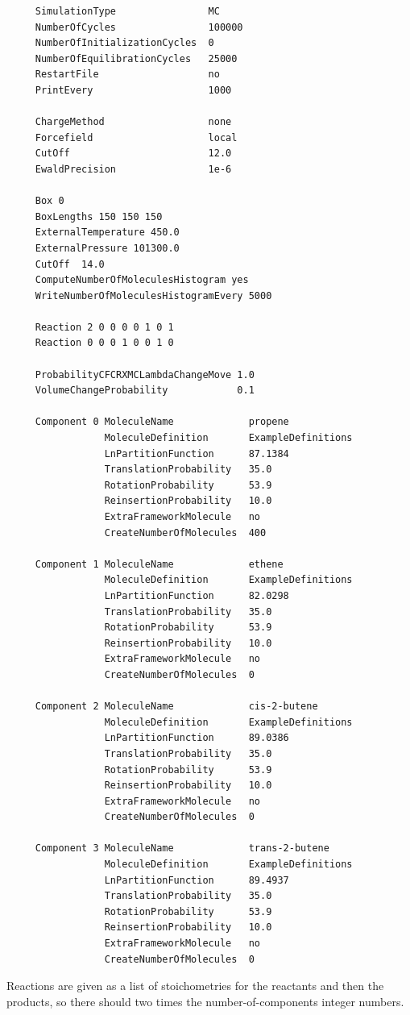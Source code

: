 \begin{tiny}
\begin{verbatim}
     SimulationType                MC
     NumberOfCycles                100000
     NumberOfInitializationCycles  0
     NumberOfEquilibrationCycles   25000
     RestartFile                   no
     PrintEvery                    1000
     
     ChargeMethod                  none
     Forcefield                    local
     CutOff                        12.0
     EwaldPrecision                1e-6
     
     Box 0
     BoxLengths 150 150 150
     ExternalTemperature 450.0
     ExternalPressure 101300.0
     CutOff  14.0
     ComputeNumberOfMoleculesHistogram yes
     WriteNumberOfMoleculesHistogramEvery 5000
     
     Reaction 2 0 0 0 0 1 0 1
     Reaction 0 0 0 1 0 0 1 0
     
     ProbabilityCFCRXMCLambdaChangeMove 1.0
     VolumeChangeProbability            0.1
     
     Component 0 MoleculeName             propene
                 MoleculeDefinition       ExampleDefinitions
                 LnPartitionFunction      87.1384
                 TranslationProbability   35.0
                 RotationProbability      53.9
                 ReinsertionProbability   10.0
                 ExtraFrameworkMolecule   no
                 CreateNumberOfMolecules  400
     
     Component 1 MoleculeName             ethene
                 MoleculeDefinition       ExampleDefinitions
                 LnPartitionFunction      82.0298
                 TranslationProbability   35.0
                 RotationProbability      53.9
                 ReinsertionProbability   10.0
                 ExtraFrameworkMolecule   no
                 CreateNumberOfMolecules  0
     
     Component 2 MoleculeName             cis-2-butene
                 MoleculeDefinition       ExampleDefinitions
                 LnPartitionFunction      89.0386
                 TranslationProbability   35.0
                 RotationProbability      53.9
                 ReinsertionProbability   10.0
                 ExtraFrameworkMolecule   no
                 CreateNumberOfMolecules  0
     
     Component 3 MoleculeName             trans-2-butene
                 MoleculeDefinition       ExampleDefinitions
                 LnPartitionFunction      89.4937
                 TranslationProbability   35.0
                 RotationProbability      53.9
                 ReinsertionProbability   10.0
                 ExtraFrameworkMolecule   no
                 CreateNumberOfMolecules  0
\end{verbatim}
\end{tiny}
Reactions are given as a list of stoichometries for the reactants and then the products, so there should two times the number-of-components integer numbers.

